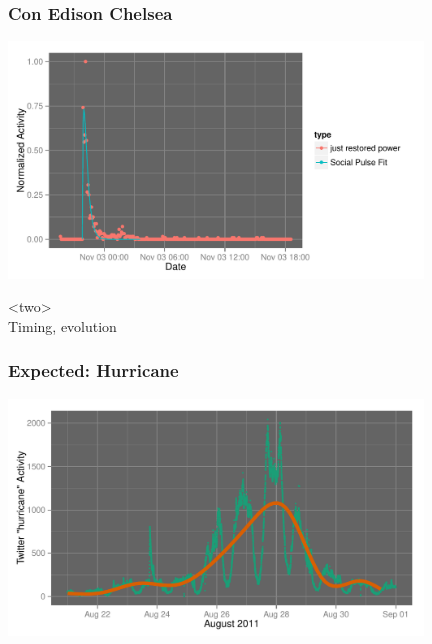 \documentclass{beamer}
\begin{document}
%
\begin{frame}\frametitle{Con Edison Chelsea}
  \begin{center}
    \includegraphics[width=11cm]{./imgs/real_fit.pdf}
  \end{center}
\end{frame}


\begin{frame}
\begin{center}
{\Huge <two> \\ [15pt] Timing, evolution}
\end{center}
\end{frame}

%

\begin{frame}\frametitle{Expected: Hurricane}
  \begin{center}
    \includegraphics[width=11cm]{./imgs/hurricane_trend.pdf}
  \end{center}
\end{frame}
%
\end{document}
